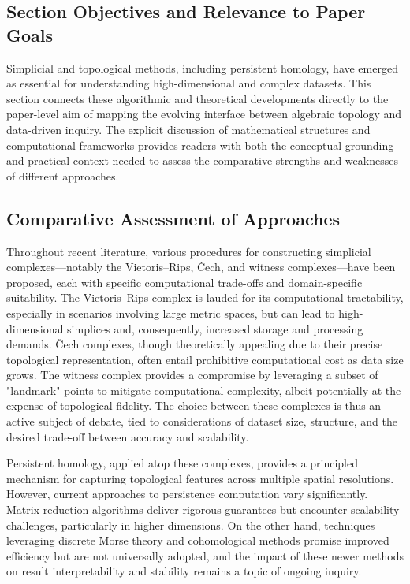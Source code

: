 \documentclass[sigconf]{acmart}
\begin{document}
\subsection{Section Objectives and Relevance to Paper Goals}

Simplicial and topological methods, including persistent homology, have emerged as essential for understanding high-dimensional and complex datasets. This section connects these algorithmic and theoretical developments directly to the paper-level aim of mapping the evolving interface between algebraic topology and data-driven inquiry. The explicit discussion of mathematical structures and computational frameworks provides readers with both the conceptual grounding and practical context needed to assess the comparative strengths and weaknesses of different approaches.

\subsection{Comparative Assessment of Approaches}

Throughout recent literature, various procedures for constructing simplicial complexes---notably the Vietoris–Rips, Čech, and witness complexes---have been proposed, each with specific computational trade-offs and domain-specific suitability. The Vietoris–Rips complex is lauded for its computational tractability, especially in scenarios involving large metric spaces, but can lead to high-dimensional simplices and, consequently, increased storage and processing demands. Čech complexes, though theoretically appealing due to their precise topological representation, often entail prohibitive computational cost as data size grows. The witness complex provides a compromise by leveraging a subset of "landmark" points to mitigate computational complexity, albeit potentially at the expense of topological fidelity. The choice between these complexes is thus an active subject of debate, tied to considerations of dataset size, structure, and the desired trade-off between accuracy and scalability.

Persistent homology, applied atop these complexes, provides a principled mechanism for capturing topological features across multiple spatial resolutions. However, current approaches to persistence computation vary significantly. Matrix-reduction algorithms deliver rigorous guarantees but encounter scalability challenges, particularly in higher dimensions. On the other hand, techniques leveraging discrete Morse theory and cohomological methods promise improved efficiency but are not universally adopted, and the impact of these newer methods on result interpretability and stability remains a topic of ongoing inquiry.
\end{document}
